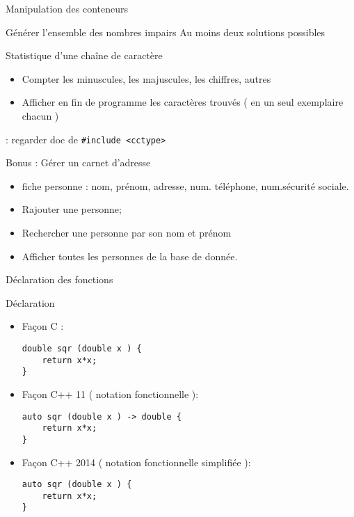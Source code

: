 \documentclass[handout,10pt]{beamer}
\begin{document}
\begin{frame}[fragile]{Manipulation des conteneurs}
\tiny
\begin{exampleblock}{Générer l'ensemble des nombres impairs}
Au moins deux solutions possibles
\end{exampleblock}

\begin{exampleblock}{Statistique d'une chaîne de caractère}
\begin{itemize}
\item Compter les minuscules, les majuscules, les chiffres, autres
\item Afficher en fin de programme les caractères trouvés ( en un seul exemplaire chacun )
\end{itemize}
{\color{red}{\bf Hint}} : regarder doc de \lstinline{#include <cctype>}
\end{exampleblock}

\begin{exampleblock}{Bonus : Gérer un carnet d'adresse}
\begin{itemize}
\item fiche personne : nom, prénom, adresse, num. téléphone, num.sécurité sociale.
\item Rajouter une personne;
\item Rechercher une personne par son nom et prénom
\item Afficher toutes les personnes de la base de donnée.
\end{itemize}
\end{exampleblock}
\end{frame}

\begin{frame}[fragile]{Déclaration des fonctions}
\tiny
\begin{block}{Déclaration}
\begin{itemize}
\item Façon C :
\begin{lstlisting}
double sqr (double x ) {
    return x*x;
}
\end{lstlisting}
\item Façon C++ 11 ( notation fonctionnelle ):
\begin{lstlisting}
auto sqr (double x ) -> double {
    return x*x;
}
\end{lstlisting}
\item Façon C++ 2014 ( notation fonctionnelle simplifiée ):
\begin{lstlisting}
auto sqr (double x ) {
    return x*x;
}
\end{lstlisting}
\end{itemize}
\end{block}
\end{frame}
\end{document}
